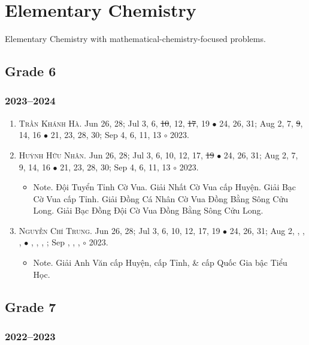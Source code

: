 \documentclass{article}
\begin{document}

\section{Elementary Chemistry}
Elementary Chemistry with mathematical-chemistry-focused problems.

\subsection{Grade 6}

\subsubsection{2023--2024}

\begin{enumerate}
	\item \textsc{Trần Khánh Hà.} {\sf[In]} Jun 26, 28; Jul 3, 6, \st{10}, 12, \st{17}, 19 $\bullet$ 24, 26, 31; Aug 2, 7, \st{9}, 14, 16 $\bullet$ 21, 23, 28, 30; Sep 4, 6, 11, 13 $\circ$ 2023. 
	\item \textsc{Huỳnh Hữu Nhân.} {\sf[In]} Jun 26, 28; Jul 3, 6, 10, 12, 17, \st{19} $\bullet$ 24, 26, 31; Aug 2, 7, 9, 14, 16 $\bullet$ 21, 23, 28, 30; Sep 4, 6, 11, 13 $\circ$ 2023.
	\begin{itemize}
		\item {\sf Note.} Đội Tuyển Tỉnh Cờ Vua. Giải Nhất Cờ Vua cấp Huyện. Giải Bạc Cờ Vua cấp Tỉnh. Giải Đồng Cá Nhân Cờ Vua Đồng Bằng Sông Cửu Long. Giải Bạc Đồng Đội Cờ Vua Đồng Bằng Sông Cửu Long.
	\end{itemize}
	\item \textsc{Nguyễn Chí Trung.} {\sf[In]} Jun 26, 28; Jul 3, 6, 10, 12, 17, 19 $\bullet$ 24, 26, 31; Aug 2, , , ,  $\bullet$ , , , ; Sep , , ,  $\circ$ 2023.
	\begin{itemize}
		\item {\sf Note.} Giải Anh Văn cấp Huyện, cấp Tỉnh, \& cấp Quốc Gia bậc Tiểu Học.
	\end{itemize}
\end{enumerate}

\subsection{Grade 7}

\subsubsection{2022--2023}
\end{document}
